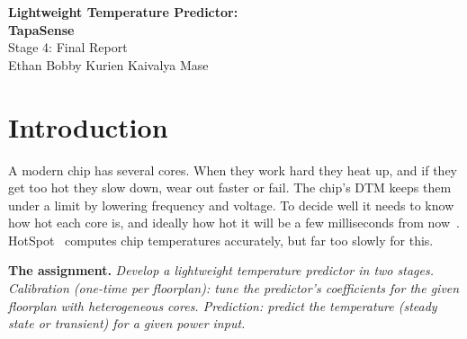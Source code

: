\documentclass[11pt,a4paper]{article}
\newcommand{\us}{\,$\mu$s}
\begin{document}
\begin{center}
{\LARGE\bfseries Lightweight Temperature Predictor:}\\[4pt]
{\Large\bfseries TapaSense}\\[4pt]
{\large Stage 4: Final Report}\\[8pt]
Ethan Bobby Kurien \quad Kaivalya Mase
\end{center}

\begin{abstract}
TapaSense predicts the temperature of every core of a multi-core chip from the core powers. The
HotSpot simulator computes these temperatures accurately, but one steady-state answer takes about
a quarter of a second, while dynamic thermal management (DTM) needs an answer every millisecond.
A one-time calibration runs HotSpot with 1\,W in one core at a time: 8 runs for the steady-state
model and 24 for the transient one. Prediction then uses only the stored coefficients. Because
HotSpot is linear, the steady-state model (an influence matrix) reproduces HotSpot exactly
(0.00003\,K worst) in 2.6\us\ from under 1\,kB. The transient model (a sum of four exponentials)
is off by 0.09\,K on average and 0.30\,K at worst, in 3.1\us\ per step from 3.7\,kB. Without
calibration, every alternative we tried is 0.8--2.8\,K off on average. Both stages are packaged
as one tool, \texttt{ltp}.
\end{abstract}

\tableofcontents

\section{Introduction}
A modern chip has several cores. When they work hard they heat up, and if they get too hot they
slow down, wear out faster or fail. The chip's DTM keeps them under a limit by lowering frequency
and voltage. To decide well it needs to know how hot each core is, and ideally how hot it will be
a few milliseconds from now~\cite{coskun09}. HotSpot~\cite{hotspot} computes chip temperatures
accurately, but far too slowly for this.

\textbf{The assignment.} \emph{Develop a lightweight temperature predictor in two stages.
Calibration (one-time per floorplan): tune the predictor's coefficients for the given floorplan
with heterogeneous cores. Prediction: predict the temperature (steady state or transient) for a
given power input.}
\end{document}
